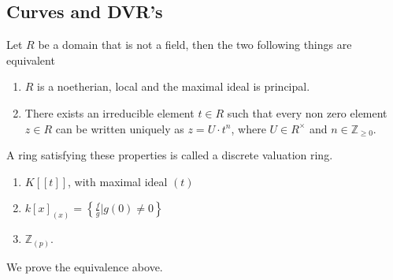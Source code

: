 \documentclass[../main.tex]{subfiles}
\begin{document}
\subsection{Curves and DVR's}
\begin{propo}
Let $R$ be a domain that is not a field, then the two following things are equivalent
\begin{enumerate}
\item $R$ is a noetherian, local and the maximal ideal is principal.
\item There exists an irreducible element $t\in R$ such that every non zero element $z\in R$ can be written uniquely as $z= U \cdot t^{n}$, where $U \in R^{\times}$ and $n \in \mathbb{Z}_{ \geq 0} $.\\

\end{enumerate}
\end{propo}
\begin{defn}
	A ring satisfying these properties is called a discrete valuation ring.
\end{defn}
\begin{exemple}
	\begin{enumerate}
	\item $ K [ [  t] ] $, with maximal ideal $( t) $ 
	\item $k[x]_{( x) } = \left\{ \frac{f}{g} | g( 0) \neq 0 \right\} $ 
	\item $ \mathbb{Z}_{ ( p) } $.

	\end{enumerate}
\end{exemple}
We prove the equivalence above.
\end{document}
